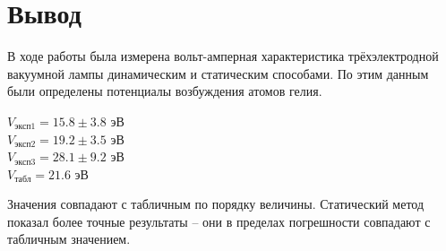 \documentclass[a4paper,12pt]{article} %
\begin{document}
\newpage

\section{Вывод}

\noindent В ходе работы была измерена вольт-амперная характеристика трёхэлектродной вакуумной лампы динамическим и статическим способами. По этим данным были определены потенциалы возбуждения атомов гелия. 
 
\begin{center}
    $V_\text{эксп1} = 15.8 \pm 3.8$  эВ \\
    $V_\text{эксп2} = 19.2 \pm 3.5$ эВ \\
    $V_\text{эксп3} = 28.1 \pm 9.2$ эВ \\
    $V_\text{табл} = 21.6 $ эВ
    
\end{center}

\noindent Значения совпадают с табличным по порядку величины. Статический метод показал более точные результаты -- они в пределах погрешности совпадают с табличным значением. 
\end{document}
